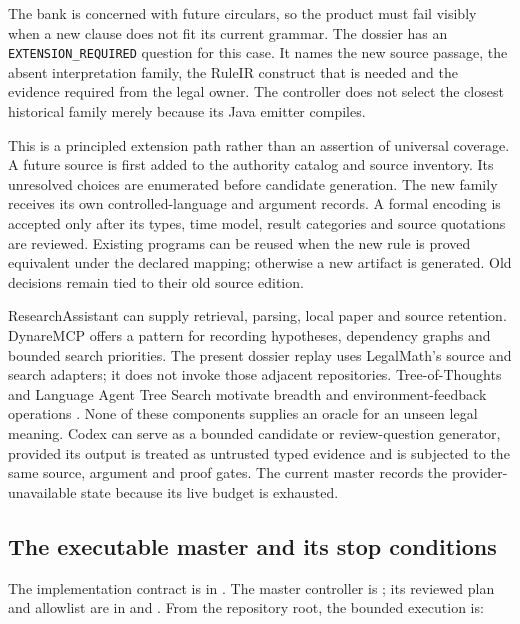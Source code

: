 \documentclass[12pt,a4paper,oneside,openany]{book}
\begin{document}
The bank is concerned with future circulars, so the product must fail visibly
when a new clause does not fit its current grammar. The dossier has an
\texttt{EXTENSION\_REQUIRED} question for this case. It names the new source
passage, the absent interpretation family, the RuleIR construct that is needed
and the evidence required from the legal owner. The controller does not select
the closest historical family merely because its Java emitter compiles.

This is a principled extension path rather than an assertion of universal
coverage. A future source is first added to the authority catalog and source
inventory. Its unresolved choices are enumerated before candidate generation.
The new family receives its own controlled-language and argument records. A
formal encoding is accepted only after its types, time model, result categories
and source quotations are reviewed. Existing programs can be reused when the
new rule is proved equivalent under the declared mapping; otherwise a new
artifact is generated. Old decisions remain tied to their old source edition.

ResearchAssistant can supply retrieval, parsing, local paper and source
retention. DynareMCP offers a pattern for recording hypotheses,
dependency graphs and bounded search priorities. The present dossier replay
uses LegalMath's source and search adapters; it does not invoke those adjacent
repositories. Tree-of-Thoughts and Language
Agent Tree Search motivate breadth and environment-feedback operations
\citep{treeofthoughts2023,lats2024}. None of these components supplies an
oracle for an unseen legal meaning. Codex can serve as a bounded candidate or
review-question generator, provided its output is treated as untrusted typed
evidence and is subjected to the same source, argument and proof gates. The
current master records the provider-unavailable state because its live budget
is exhausted.

\subsection{The executable master and its stop conditions}

The implementation contract is in
. The
master controller is
; its reviewed plan and allowlist
are in  and
. From the
repository root, the bounded execution is:
\end{document}
